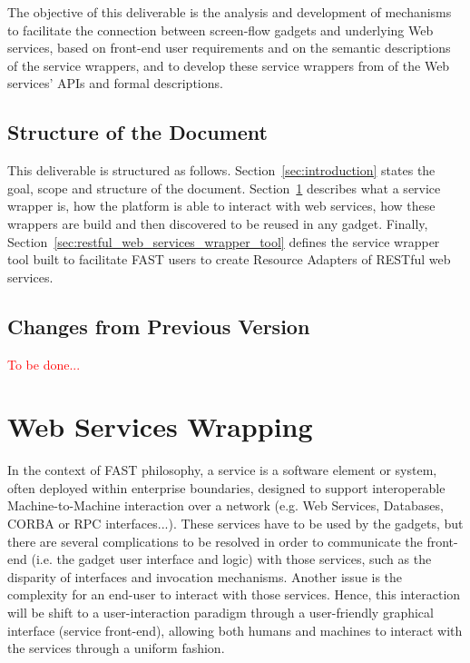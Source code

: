 \documentclass{fast_latex}
\begin{document}
The objective of this deliverable is the analysis and development of mechanisms to facilitate the connection between screen-flow gadgets and underlying Web services, based on front-end user requirements and on the semantic descriptions of the service wrappers, and to develop these service wrappers from of the Web services' APIs and formal descriptions.


\subsection{Structure of the Document} %
\label{sub:structure_of_the_document}

This deliverable is structured as follows. Section~\ref{sec:introduction} states the goal, scope and structure of the document. Section~\ref{sec:web_services_wrapping} describes what a service wrapper is, how the platform is able to interact with web services, how these wrappers are build and then discovered to be reused in any gadget. Finally, Section~\ref{sec:restful_web_services_wrapper_tool} defines the service wrapper tool built to facilitate FAST users to create Resource Adapters of RESTful web services.


\subsection{Changes from Previous Version} %
\label{sub:changes_from_previous_version}

\textcolor{red}{To be done...}




\clearpage
\section{Web Services Wrapping} %
\label{sec:web_services_wrapping}

In the context of FAST philosophy, a service is a software element or system, often deployed within enterprise boundaries, designed to support interoperable Machine-to-Machine interaction over a network (e.g. Web Services, Databases, CORBA or RPC interfaces...). These services have to be used by the gadgets, but there are several complications to be resolved in order to communicate the front-end (i.e. the gadget user interface and logic) with those services, such as the disparity of interfaces and invocation mechanisms. Another issue is the complexity for an end-user to interact with those services. Hence, this interaction will be shift to a user-interaction paradigm through a user-friendly graphical interface (service front-end), allowing both humans and machines to interact with the services through a uniform fashion.
\end{document}
